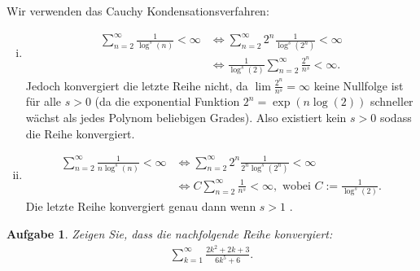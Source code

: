 \documentclass[a4paper, 20]{exam}
\newtheorem{ex}{Aufgabe}
\begin{document}
\begin{solution} Wir verwenden das Cauchy Kondensationsverfahren:
\begin{enumerate}[i)]
\item 
\begin{align*}
\sum_{n=2}^\infty \frac{1}{\log^s(n)}< \infty &\iff \sum_{n=2} ^\infty  2^n \frac{1}{\log^s(2^n)}< \infty  \\
& \iff \frac{1}{\log^s(2)} \sum_{n=2}^\infty \frac{2^n}{n^s} < \infty.
\end{align*}
Jedoch konvergiert die letzte Reihe nicht, da $\lim \frac{2^n }{n^s} = \infty$ keine Nullfolge ist für alle $s >0$ (da die exponential Funktion $2^n= \exp(n \log(2))$ schneller wächst als jedes Polynom beliebigen Grades). Also existiert kein $s>0$ sodass die Reihe konvergiert. 
\item
\begin{align*}
\sum_{n=2}^\infty \frac{1}{n \log^s(n)}< \infty &\iff \sum_{n=2}^\infty 2^n \frac{1}{2^n\log^s(2^n)}< \infty \\
& \iff C\sum_{n=2}^\infty \frac{1}{n^s}< \infty, \text{ wobei } C:= \frac{1}{\log^s(2)}.
\end{align*}
Die letzte Reihe konvergiert genau dann wenn $s > 1$ .
\end{enumerate}

\end{solution}


\begin{ex} Zeigen Sie, dass die nachfolgende Reihe konvergiert:
\begin{align*}
 \sum_{k=1}^\infty \frac{2k^2+2k+3}{6k^5+6}.
\end{align*}
\end{ex}
\end{document}
